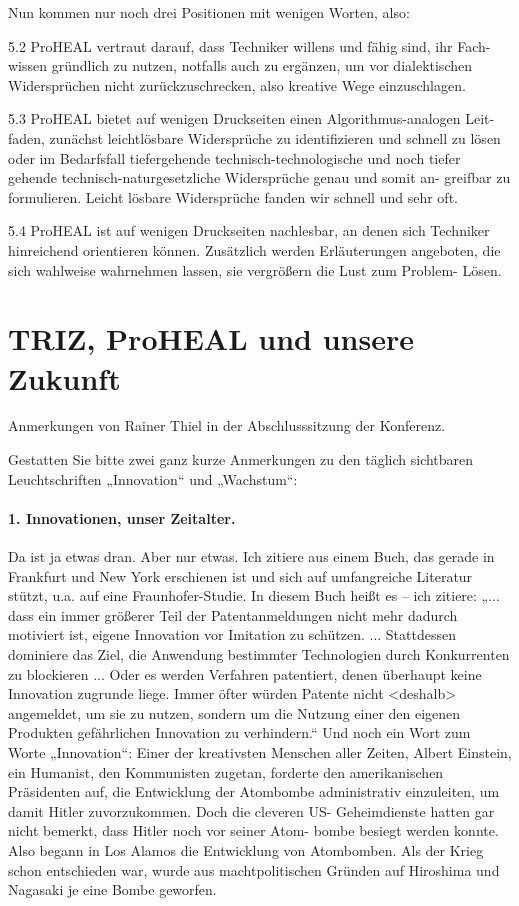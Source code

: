 \documentclass[12pt,a4paper]{article}
\begin{document}
Nun kommen nur noch drei Positionen mit wenigen Worten, also:

5.2 ProHEAL vertraut darauf, dass Techniker willens und fähig sind, ihr Fach-
wissen gründlich zu nutzen, notfalls auch zu ergänzen, um vor dialektischen
Widersprüchen nicht zurückzuschrecken, also kreative Wege einzuschlagen.

5.3 ProHEAL bietet auf wenigen Druckseiten einen Algorithmus-analogen Leit-
faden, zunächst leichtlösbare Widersprüche zu identifizieren und schnell zu
lösen oder im Bedarfsfall tiefergehende technisch-technologische und noch
tiefer gehende technisch-naturgesetzliche Widersprüche genau und somit an-
greifbar zu formulieren. Leicht lösbare Widersprüche fanden wir schnell und
sehr oft.

5.4 ProHEAL ist auf wenigen Druckseiten nachlesbar, an denen sich Techniker
hinreichend orientieren können. Zusätzlich werden Erläuterungen angeboten, die
sich wahlweise wahrnehmen lassen, sie vergrößern die Lust zum Problem- Lösen.

\section*{TRIZ, ProHEAL und unsere Zukunft}

Anmerkungen von Rainer Thiel in der Abschlusssitzung der Konferenz.

Gestatten Sie bitte zwei ganz kurze Anmerkungen zu den täglich sichtbaren
Leuchtschriften „Innovation“ und „Wachstum“:

\paragraph{1. Innovationen, unser Zeitalter.}
Da ist ja etwas dran. Aber nur etwas. Ich zitiere aus einem Buch, das gerade
in Frankfurt und New York erschienen ist und sich auf umfangreiche Literatur
stützt, u.a. auf eine Fraunhofer-Studie. In diesem Buch heißt es – ich
zitiere: „... dass ein immer größerer Teil der Patentanmeldungen nicht mehr
dadurch motiviert ist, eigene Innovation vor Imitation zu
schützen. ... Stattdessen dominiere das Ziel, die Anwendung bestimmter
Technologien durch Konkurrenten zu blockieren ... Oder es werden Verfahren
patentiert, denen überhaupt keine Innovation zugrunde liege. Immer öfter
würden Patente nicht <deshalb> angemeldet, um sie zu nutzen, sondern um die
Nutzung einer den eigenen Produkten gefährlichen Innovation zu verhindern.“
Und noch ein Wort zum Worte „Innovation“: Einer der kreativsten Menschen aller
Zeiten, Albert Einstein, ein Humanist, den Kommunisten zugetan, forderte den
amerikanischen Präsidenten auf, die Entwicklung der Atombombe administrativ
einzuleiten, um damit Hitler zuvorzukommen. Doch die cleveren US-
Geheimdienste hatten gar nicht bemerkt, dass Hitler noch vor seiner Atom-
bombe besiegt werden konnte. Also begann in Los Alamos die Entwicklung von
Atombomben. Als der Krieg schon entschieden war, wurde aus machtpolitischen
Gründen auf Hiroshima und Nagasaki je eine Bombe geworfen.
\end{document}
